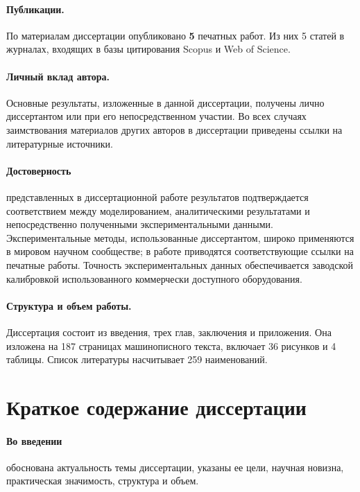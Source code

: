\documentclass[14pt, a4paper]{extarticle}
\begin{document}
\paragraph{Публикации.} По материалам диссертации опубликовано \textbf{5} печатных работ. Из них 5 статей в журналах, входящих в базы цитирования Scopus и Web of Science. 

\paragraph{Личный вклад автора.} Основные результаты, изложенные в данной диссертации, получены лично диссертантом или при его непосредственном участии. Во всех случаях
заимствования материалов других авторов в диссертации приведены ссылки
на литературные источники.

\paragraph{Достоверность} представленных в диссертационной работе результатов подтверждается соответствием между моделированием, аналитическими результатами и непосредственно полученными экспериментальными данными. Экспериментальные методы, использованные диссертантом, широко применяются в мировом научном сообществе; в работе приводятся соответствующие ссылки на печатные работы. Точность экспериментальных данных обеспечивается заводской калибровкой использованного коммерчески доступного оборудования.

\paragraph{Структура и объем работы.} Диссертация состоит из введения, трех глав, заключения и приложения. Она изложена на 187 страницах машинописного текста, включает 36 рисунков и 4 таблицы. Список литературы насчитывает 259 наименований.

\section*{Краткое содержание диссертации}

\paragraph{Во введении} обоснована актуальность темы диссертации, указаны ее цели, научная новизна, практическая значимость, структура и объем.
\end{document}
